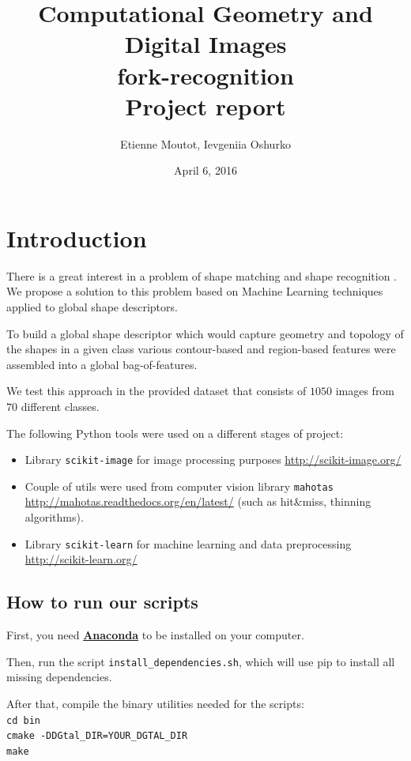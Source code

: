 \documentclass[12pt]{article}
\begin{document}
\title{
Computational Geometry and Digital Images \\
\textbf{fork-recognition}\\
Project report
}

\author{Etienne Moutot, Ievgeniia Oshurko}
\date{April 6, 2016}
\maketitle


\section{Introduction}  

There is a great interest in a problem of shape matching and shape recognition \cite{Zhang20041}. We propose a solution to this problem based on Machine Learning techniques applied to global shape descriptors.

To build a global shape descriptor which would capture geometry and topology of the shapes in a given class various contour-based and region-based features were assembled into a global bag-of-features.

We test this approach in the provided dataset that consists of $1 050$ images from $70$ different classes.

The following Python tools were used on a different stages of project:
\begin{itemize}
\item Library \texttt{scikit-image} for image processing purposes \url{http://scikit-image.org/}
\item Couple of utils were used from computer vision library \texttt{mahotas} \url{http://mahotas.readthedocs.org/en/latest/} (such as hit\&miss, thinning algorithms).
\item Library \texttt{scikit-learn} for machine learning and data preprocessing \url{http://scikit-learn.org/}
\end{itemize}

\subsection{How to run our scripts}
First, you need \href{https://www.continuum.io/downloads}{\textbf{Anaconda}} to be installed on your computer.

Then, run the script \texttt{install\_dependencies.sh}, which will use pip to install all missing dependencies.

After that, compile the binary utilities needed for the scripts:\\
\texttt{cd bin}\\
\texttt{cmake -DDGtal\_DIR=YOUR\_DGTAL\_DIR}\\
\texttt{make}
\end{document}
